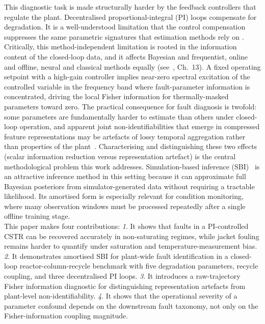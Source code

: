 \documentclass[aps,pre,twocolumn,superscriptaddress,floatfix]{revtex4-2}
\begin{document}
This diagnostic task is made structurally harder by the feedback controllers
that regulate the plant. Decentralised proportional-integral (PI) loops
compensate for degradation.
It is a well-understood limitation that the control compensation suppresses the same parametric
signatures that estimation methods rely on \citep{Gustavsson1977, Forssell1999}. 
Critically, this method-independent limitation is rooted in the information content
of the closed-loop data, and it affects Bayesian and frequentist, online and offline,
neural and classical methods equally (see~\citealt{Ljung1999}, Ch.~13). A fixed 
operating setpoint with a high-gain
controller implies near-zero spectral excitation of the controlled variable in the
frequency band where fault-parameter information is concentrated, driving the local
Fisher information for thermally-masked parameters toward zero. The practical
consequence for fault diagnosis is twofold: some parameters are fundamentally
harder to estimate than others under closed-loop operation, and apparent
joint non-identifiabilities that emerge in compressed feature representations may
be artefacts of lossy temporal aggregation rather than properties of the plant~\citep{s26123948}.  
Characterising and distinguishing these two effects (scalar information reduction versus
representation artefact) is the central methodological problem this work addresses.
Simulation-based inference (SBI)~\citep{Cranmer2020} is an attractive inference method in
this setting because it can approximate full Bayesian posteriors from simulator-generated
data without requiring a tractable likelihood. Its amortised form is especially relevant
for condition monitoring, where many observation windows must be processed repeatedly
after a single offline training stage. \\
This paper makes four contributions:
\emph{1}. It shows that faults in a PI-controlled CSTR can be recovered accurately in 
non-saturating regimes, while jacket fouling remains harder to quantify under saturation and temperature-measurement bias.
\emph{2}. It demonstrates amortised SBI for plant-wide fault identification in a 
closed-loop reactor-column-recycle benchmark with five degradation parameters, recycle 
coupling, and three decentralised PI loops.
\emph{3}. It introduces a raw-trajectory Fisher information diagnostic for distinguishing
representation artefacts from plant-level non-identifiability.
\emph{4}. It shows that the operational severity of a parameter confound depends on the 
downstream fault taxonomy, not only on the Fisher-information coupling magnitude.
\end{document}
